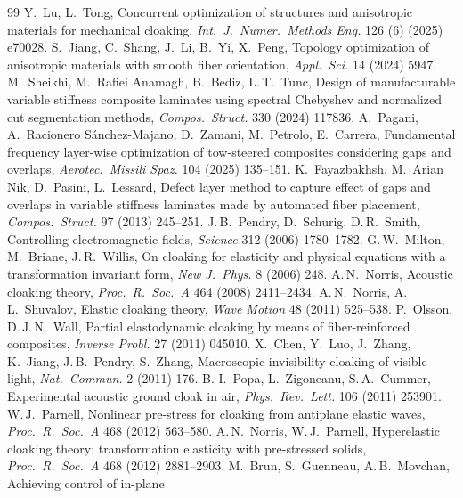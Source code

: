 \begin{thebibliography}{99}
 Y.\ Lu, L.\ Tong, Concurrent optimization of structures and anisotropic materials
for mechanical cloaking, \emph{Int.\ J.\ Numer.\ Methods Eng.} 126 (6) (2025) e70028.
 S.\ Jiang, C.\ Shang, J.\ Li, B.\ Yi, X.\ Peng, Topology optimization of anisotropic materials with
smooth fiber orientation, \emph{Appl.\ Sci.} 14 (2024) 5947.
 M.\ Sheikhi, M.\ Rafiei Anamagh, B.\ Bediz, L.\,T.\ Tunc, Design of
manufacturable variable stiffness composite laminates using spectral Chebyshev and normalized
cut segmentation methods, \emph{Compos.\ Struct.} 330 (2024) 117836.
 A.\ Pagani, A.\ Racionero S\'anchez-Majano, D.\ Zamani, M.\ Petrolo,
E.\ Carrera, Fundamental frequency layer-wise optimization of tow-steered composites
considering gaps and overlaps, \emph{Aerotec.\ Missili Spaz.} 104 (2025) 135--151.
 K.\ Fayazbakhsh, M.\ Arian Nik, D.\ Pasini, L.\ Lessard, Defect
layer method to capture effect of gaps and overlaps in variable stiffness laminates made by
automated fiber placement, \emph{Compos.\ Struct.} 97 (2013) 245--251.
 J.\,B.\ Pendry, D.\ Schurig, D.\,R.\ Smith, Controlling electromagnetic
fields, \emph{Science} 312 (2006) 1780--1782.
 G.\,W.\ Milton, M.\ Briane, J.\,R.\ Willis, On cloaking for elasticity and
physical equations with a transformation invariant form, \emph{New J.\ Phys.} 8 (2006) 248.
 A.\,N.\ Norris, Acoustic cloaking theory, \emph{Proc.\ R.\ Soc.\ A} 464
(2008) 2411--2434.
 A.\,N.\ Norris, A.\,L.\ Shuvalov, Elastic cloaking theory, \emph{Wave
Motion} 48 (2011) 525--538.
 P.\ Olsson, D.\,J.\,N.\ Wall, Partial elastodynamic cloaking by means of
fiber-reinforced composites, \emph{Inverse Probl.} 27 (2011) 045010.
 X.\ Chen, Y.\ Luo, J.\ Zhang, K.\ Jiang, J.\,B.\ Pendry, S.\ Zhang, Macroscopic
invisibility cloaking of visible light, \emph{Nat.\ Commun.} 2 (2011) 176.
 B.-I.\ Popa, L.\ Zigoneanu, S.\,A.\ Cummer, Experimental acoustic ground cloak in
air, \emph{Phys.\ Rev.\ Lett.} 106 (2011) 253901.
 W.\,J.\ Parnell, Nonlinear pre-stress for cloaking from antiplane elastic
waves, \emph{Proc.\ R.\ Soc.\ A} 468 (2012) 563--580.
 A.\,N.\ Norris, W.\,J.\ Parnell, Hyperelastic cloaking theory:
transformation elasticity with pre-stressed solids, \emph{Proc.\ R.\ Soc.\ A} 468 (2012)
2881--2903.
 M.\ Brun, S.\ Guenneau, A.\,B.\ Movchan, Achieving control of in-plane

\end{thebibliography}
